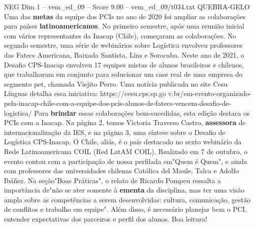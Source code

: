 \begin{textsample}{NEG Dim 1 – vem\_ed\_09 – Score 9.00 – vem\_ed\_09/t034.txt}  \label{ex:f1_neg_104}
QUEBRA-GELO Uma das \textbf{metas} da equipe dos PCIs no ano de 2020 foi ampliar as colaborações para países \textbf{latinoamericanos}.
No primeiro semestre, após uma reunião inicial com vários representantes da Inacap (Chile), começaram as colaborações.
No segundo semestre, uma série de webinários sobre Logística envolveu professores das Fatecs Americana, Baixada Santista, Lins e Sorocaba.
Neste ano de 2021, o Desafio CPS-Inacap envolveu 17 equipes mistas de alunos brasileiros e chilenos, que trabalharam em conjunto para solucionar um case real de uma empresa do segmento pet, chamada Viejito Perro.
Uma notícia publicada no site Cesu Línguas detalha essa iniciativa: https://cesu.cps.sp.go v.br/em-evento-organizado-pela-inacap-chile-com-a-equipe-dos-pcis-alunos-de-fatecs-vencem-desafio-de-logistica/ Para \textbf{brindar} essas colaborações bem-sucedidas, esta edição destaca os PCIs com a Inacap.
Na página 2, temos Victoria Traverso Castro, \textbf{assessora} de internacionalização da IES, e na página 3, uma síntese sobre o Desafio de Logística CPS-Inacap.
O Chile, aliás, é o país destacado no sexto webinário da Rede Latinoamericana COIL (Red LatAM COIL).
Realizado em 7 de outubro, o evento contou com a participação de nossa perfilada em"Quem é Quem", e ainda com professores das universidades chilenas Católica del Maule, Talca e Adolfo Ibáñez.
Na seção"Boas Práticas", o relato de Ricardo Pompeu ressalta a importância de"não se ater somente à \textbf{ementa} da disciplina, mas ter uma visão ampla sobre as competências a serem desenvolvidas: cultura, comunicação, gestão de conflitos e trabalho em equipe".
Além disso, é necessário planejar bem o PCI, entender expectativas dos parceiros e perfil dos alunos.
Boa leitura!

\end{textsample}
